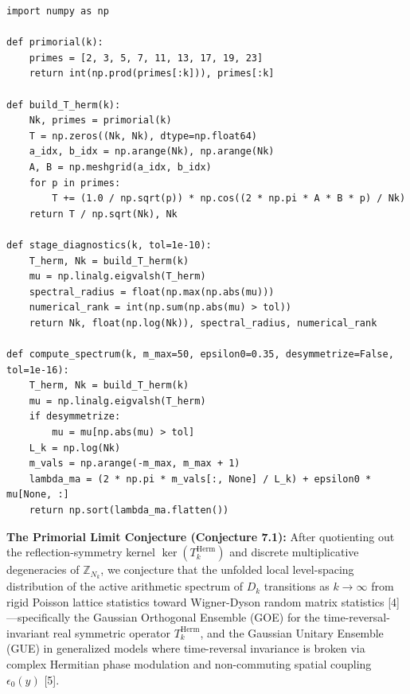 \documentclass[11pt, a4paper]{article}
\begin{document}
\begin{verbatim}
import numpy as np

def primorial(k):
    primes = [2, 3, 5, 7, 11, 13, 17, 19, 23]
    return int(np.prod(primes[:k])), primes[:k]

def build_T_herm(k):
    Nk, primes = primorial(k)
    T = np.zeros((Nk, Nk), dtype=np.float64)
    a_idx, b_idx = np.arange(Nk), np.arange(Nk)
    A, B = np.meshgrid(a_idx, b_idx)
    for p in primes:
        T += (1.0 / np.sqrt(p)) * np.cos((2 * np.pi * A * B * p) / Nk)
    return T / np.sqrt(Nk), Nk

def stage_diagnostics(k, tol=1e-10):
    T_herm, Nk = build_T_herm(k)
    mu = np.linalg.eigvalsh(T_herm)
    spectral_radius = float(np.max(np.abs(mu)))
    numerical_rank = int(np.sum(np.abs(mu) > tol))
    return Nk, float(np.log(Nk)), spectral_radius, numerical_rank

def compute_spectrum(k, m_max=50, epsilon0=0.35, desymmetrize=False, tol=1e-16):
    T_herm, Nk = build_T_herm(k)
    mu = np.linalg.eigvalsh(T_herm)
    if desymmetrize:
        mu = mu[np.abs(mu) > tol]
    L_k = np.log(Nk)
    m_vals = np.arange(-m_max, m_max + 1)
    lambda_ma = (2 * np.pi * m_vals[:, None] / L_k) + epsilon0 * mu[None, :]
    return np.sort(lambda_ma.flatten())
\end{verbatim}

\noindent\textbf{The Primorial Limit Conjecture (Conjecture 7.1):} After quotienting out the reflection-symmetry kernel $\ker(T_k^{\mathrm{Herm}})$ and discrete multiplicative degeneracies of $\mathbb{Z}_{N_k}$, we conjecture that the unfolded local level-spacing distribution of the active arithmetic spectrum of $D_k$ transitions as $k \rightarrow \infty$ from rigid Poisson lattice statistics toward Wigner-Dyson random matrix statistics [4]---specifically the Gaussian Orthogonal Ensemble (GOE) for the time-reversal-invariant real symmetric operator $T_k^{\mathrm{Herm}}$, and the Gaussian Unitary Ensemble (GUE) in generalized models where time-reversal invariance is broken via complex Hermitian phase modulation and non-commuting spatial coupling $\epsilon_0(y)$ [5].
\end{document}
